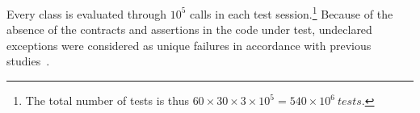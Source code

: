 \documentclass[conference]{IEEEtran}
\begin{document}
Every class is evaluated through $10^5$ calls in each test session.\footnote{The total number of tests is thus $60\times 30\times 3 \times 10^5 = 540\times 10^6~tests$.} Because of the absence of the contracts and assertions in the code under test, undeclared exceptions were considered as unique failures in accordance with previous studies~\cite{Oriol2012}.


\end{document}
